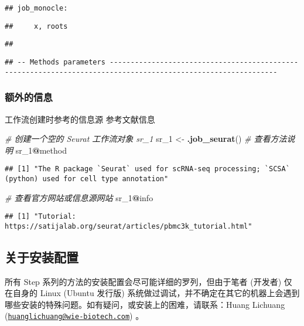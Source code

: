 \documentclass[
]{article}
\newenvironment{Shaded}{\begin{snugshade}}{\end{snugshade}}
\newcommand{\CommentTok}[1]{\textcolor[rgb]{0.56,0.35,0.01}{\textit{#1}}}
\newcommand{\DecValTok}[1]{\textcolor[rgb]{0.00,0.00,0.81}{#1}}
\newcommand{\KeywordTok}[1]{\textcolor[rgb]{0.13,0.29,0.53}{\textbf{#1}}}
\newcommand{\NormalTok}[1]{#1}
\newcommand{\OperatorTok}[1]{\textcolor[rgb]{0.81,0.36,0.00}{\textbf{#1}}}
\newcommand{\StringTok}[1]{\textcolor[rgb]{0.31,0.60,0.02}{#1}}
\begin{document}
\begin{verbatim}
## job_monocle:
\end{verbatim}

\begin{verbatim}
##     x, roots
\end{verbatim}

\begin{verbatim}
## 
\end{verbatim}

\begin{verbatim}
## -- Methods parameters --------------------------------------------------------------------------------------------------------------
\end{verbatim}

\hypertarget{ux989dux5916ux7684ux4fe1ux606f}{%
\subsubsection{额外的信息}\label{ux989dux5916ux7684ux4fe1ux606f}}

工作流创建时参考的信息源
参考文献信息

\begin{Shaded}
\begin{Highlighting}[]
\CommentTok{\# 创建一个空的 Seurat 工作流对象 \textquotesingle{}sr\_1\textquotesingle{}}
\NormalTok{sr\_}\DecValTok{1}\NormalTok{ \textless{}{-}}\StringTok{ }\KeywordTok{.job\_seurat}\NormalTok{()}
\CommentTok{\# 查看方法说明}
\NormalTok{sr\_}\DecValTok{1}\OperatorTok{@}\NormalTok{method}
\end{Highlighting}
\end{Shaded}

\begin{verbatim}
## [1] "The R package `Seurat` used for scRNA-seq processing; `SCSA` (python) used for cell type annotation"
\end{verbatim}

\begin{Shaded}
\begin{Highlighting}[]
\CommentTok{\# 查看官方网站或信息源网站}
\NormalTok{sr\_}\DecValTok{1}\OperatorTok{@}\NormalTok{info}
\end{Highlighting}
\end{Shaded}

\begin{verbatim}
## [1] "Tutorial: https://satijalab.org/seurat/articles/pbmc3k_tutorial.html"
\end{verbatim}

\hypertarget{ux5173ux4e8eux5b89ux88c5ux914dux7f6e}{%
\subsection{关于安装配置}\label{ux5173ux4e8eux5b89ux88c5ux914dux7f6e}}

所有 Step 系列的方法的安装配置会尽可能详细的罗列，但由于笔者 (开发者) 仅在自身的 Linux (Ubuntu 发行版) 系统做过调试，并不确定在其它的机器上会遇到哪些安装的特殊问题。如有疑问，或安装上的困难，请联系：Huang Lichuang (\href{mailto:huanglichuang@wie-biotech.com}{\nolinkurl{huanglichuang@wie-biotech.com}}) 。
\end{document}
